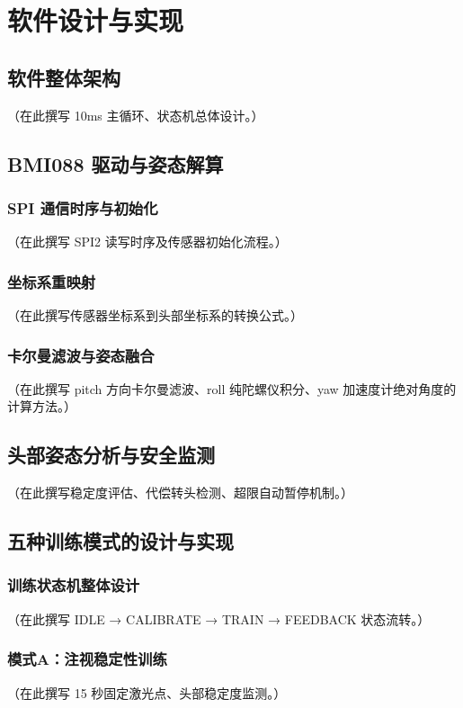 \chapter{软件设计与实现}

\section{软件整体架构}
（在此撰写 10ms 主循环、状态机总体设计。）

\section{BMI088 驱动与姿态解算}
\subsection{SPI 通信时序与初始化}
（在此撰写 SPI2 读写时序及传感器初始化流程。）
\subsection{坐标系重映射}
（在此撰写传感器坐标系到头部坐标系的转换公式。）
\subsection{卡尔曼滤波与姿态融合}
（在此撰写 pitch 方向卡尔曼滤波、roll 纯陀螺仪积分、yaw 加速度计绝对角度的计算方法。）

\section{头部姿态分析与安全监测}
（在此撰写稳定度评估、代偿转头检测、超限自动暂停机制。）

\section{五种训练模式的设计与实现}
\subsection{训练状态机整体设计}
（在此撰写 IDLE → CALIBRATE → TRAIN → FEEDBACK 状态流转。）
\subsection{模式A：注视稳定性训练}
（在此撰写 15 秒固定激光点、头部稳定度监测。）
